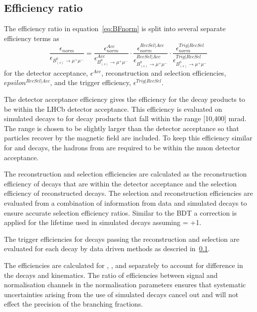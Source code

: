 {{\subsection{Efficiency ratio}
The efficiency ratio in equation~\ref{eq:BFnorm} is split into several separate efficiency terms as
\begin{equation}
\frac{\epsilon_{norm}}{\epsilon_{B^{0}_{(s)} \to \mu^{+} \mu^{-}}}  =  \frac{\epsilon^{Acc}_{norm}}{\epsilon^{Acc}_{B^{0}_{(s)} \to \mu^{+} \mu^{-}}} \cdot \frac{\epsilon^{RecSel|Acc}_{norm}}{\epsilon^{RecSel|Acc}_{B^{0}_{(s)} \to \mu^{+} \mu^{-}}} \cdot \frac{\epsilon^{Trig|RecSel}_{norm}}{\epsilon^{Trig|RecSel}_{B^{0}_{(s)} \to \mu^{+} \mu^{-}}}
\label{eq:BFnormDetailed}
\end{equation}
for the detector acceptance, $\epsilon^{Acc}$, reconstruction and selection efficiencies, $epsilon^{RecSel|Acc}$, and the trigger efficiency, $\epsilon^{Trig|RecSel}$. 

The detector acceptance efficiency gives the efficiency for the decay products to be within the LHCb detector acceptance. This efficiency is evaluated on simulated decays to for decay products that fall within the range [10,400] mrad. The range is chosen to be slightly larger than the detector acceptance so that particles recover by the magnetic field are included. To keep this efficiency similar for \bmumu and \bdkpi decays, the hadrons from \bdkpi are required to be within the muon detector acceptance. 

The reconstruction and selection efficiencies are calculated as the reconstruction efficiency of decays that are within the detector acceptance and the selection efficiency of reconstructed decays. The selection and reconstruction efficiencies are evaluated from a combination of information from data and simulated decays to ensure accurate selection efficiency ratios. Similar to the \bsmumu BDT \pdf a correction is applied for the lifetime used in simulated \bsmumu decays assuming \ADG = +1. 

The trigger efficiencies for decays passing the reconstruction and selection are evaluated for each decay by data driven methods as descried in~\ref{}. 

The efficiencies are calculated for \bsmumu, \bdmumu, \bdkpi and \bujpsik separately to account for difference in the decays and kinematics. The ratio of efficiencies between signal and normalisation channels in the normalisation parameters ensures that systematic uncertainties arising from the use of simulated decays cancel out and will not effect the precision of the \bmumu branching fractions.

}}
